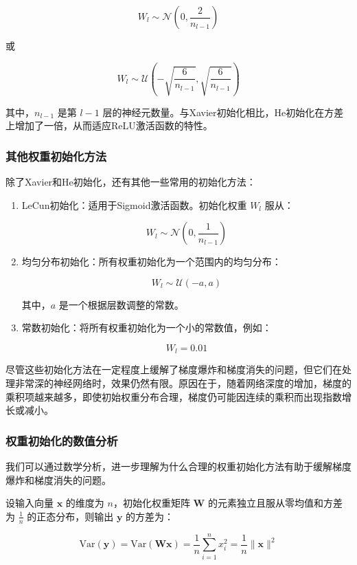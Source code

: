 \documentclass[12pt,a4paper]{amsart}
\begin{document}
\[ W_l \sim \mathcal{N}\left(0, \frac{2}{n_{l-1}}\right) \]

或

\[ W_l \sim \mathcal{U}\left(-\sqrt{\frac{6}{n_{l-1}}}, \sqrt{\frac{6}{n_{l-1}}}\right) \]

其中，\( n_{l-1} \) 是第 \( l-1 \) 层的神经元数量。与Xavier初始化相比，He初始化在方差上增加了一倍，从而适应ReLU激活函数的特性。

\subsubsection{其他权重初始化方法}

除了Xavier和He初始化，还有其他一些常用的初始化方法：

\begin{enumerate}


  \item LeCun初始化：适用于Sigmoid激活函数。初始化权重 \( W_l \) 服从：

  \[ W_l \sim \mathcal{N}\left(0, \frac{1}{n_{l-1}}\right) \]

  \item 均匀分布初始化：所有权重初始化为一个范围内的均匀分布：

  \[ W_l \sim \mathcal{U}(-a, a) \]

  其中，\( a \) 是一个根据层数调整的常数。

  \item 常数初始化：将所有权重初始化为一个小的常数值，例如：

  \[ W_l = 0.01 \]

\end{enumerate}

尽管这些初始化方法在一定程度上缓解了梯度爆炸和梯度消失的问题，但它们在处理非常深的神经网络时，效果仍然有限。原因在于，随着网络深度的增加，梯度的乘积项越来越多，即使初始权重分布合理，梯度仍可能因连续的乘积而出现指数增长或减小。

\subsubsection{权重初始化的数值分析}

我们可以通过数学分析，进一步理解为什么合理的权重初始化方法有助于缓解梯度爆炸和梯度消失的问题。

设输入向量 \( \mathbf{x} \) 的维度为 \( n \)，初始化权重矩阵 \( \mathbf{W} \) 的元素独立且服从零均值和方差为 \( \frac{1}{n} \) 的正态分布，则输出 \( \mathbf{y} \) 的方差为：

\[ \text{Var}(\mathbf{y}) = \text{Var}(\mathbf{W}\mathbf{x}) = \frac{1}{n} \sum_{i=1}^n x_i^2 = \frac{1}{n} \|\mathbf{x}\|^2 \]
\end{document}

